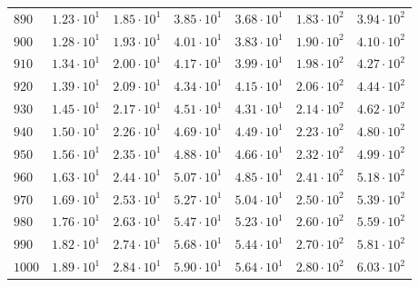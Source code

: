\begin{table}[h]
\begin{tabular}{lcccccc}
$	890	$ & $	1.23 \cdot 10^{1} 	$ & $	1.85 \cdot 10^{1} 	$ & $	3.85 \cdot 10^{1} 	$ & $	3.68 \cdot 10^{1} 	$ & $	1.83 \cdot 10^{2} 	$ & $	3.94 \cdot 10^{2} 	 $ \\
$	900	$ & $	1.28 \cdot 10^{1} 	$ & $	1.93 \cdot 10^{1} 	$ & $	4.01 \cdot 10^{1} 	$ & $	3.83 \cdot 10^{1} 	$ & $	1.90 \cdot 10^{2} 	$ & $	4.10 \cdot 10^{2} 	 $ \\
$	910	$ & $	1.34 \cdot 10^{1} 	$ & $	2.00 \cdot 10^{1} 	$ & $	4.17 \cdot 10^{1} 	$ & $	3.99 \cdot 10^{1} 	$ & $	1.98 \cdot 10^{2} 	$ & $	4.27 \cdot 10^{2} 	 $ \\
$	920	$ & $	1.39 \cdot 10^{1} 	$ & $	2.09 \cdot 10^{1} 	$ & $	4.34 \cdot 10^{1} 	$ & $	4.15 \cdot 10^{1} 	$ & $	2.06 \cdot 10^{2} 	$ & $	4.44 \cdot 10^{2} 	 $ \\
$	930	$ & $	1.45 \cdot 10^{1} 	$ & $	2.17 \cdot 10^{1} 	$ & $	4.51 \cdot 10^{1} 	$ & $	4.31 \cdot 10^{1} 	$ & $	2.14 \cdot 10^{2} 	$ & $	4.62 \cdot 10^{2} 	 $ \\
$	940	$ & $	1.50 \cdot 10^{1} 	$ & $	2.26 \cdot 10^{1} 	$ & $	4.69 \cdot 10^{1} 	$ & $	4.49 \cdot 10^{1} 	$ & $	2.23 \cdot 10^{2} 	$ & $	4.80 \cdot 10^{2} 	 $ \\
$	950	$ & $	1.56 \cdot 10^{1} 	$ & $	2.35 \cdot 10^{1} 	$ & $	4.88 \cdot 10^{1} 	$ & $	4.66 \cdot 10^{1} 	$ & $	2.32 \cdot 10^{2} 	$ & $	4.99 \cdot 10^{2} 	 $ \\
$	960	$ & $	1.63 \cdot 10^{1} 	$ & $	2.44 \cdot 10^{1} 	$ & $	5.07 \cdot 10^{1} 	$ & $	4.85 \cdot 10^{1} 	$ & $	2.41 \cdot 10^{2} 	$ & $	5.18 \cdot 10^{2} 	 $ \\
$	970	$ & $	1.69 \cdot 10^{1} 	$ & $	2.53 \cdot 10^{1} 	$ & $	5.27 \cdot 10^{1} 	$ & $	5.04 \cdot 10^{1} 	$ & $	2.50 \cdot 10^{2} 	$ & $	5.39 \cdot 10^{2} 	 $ \\
$	980	$ & $	1.76 \cdot 10^{1} 	$ & $	2.63 \cdot 10^{1} 	$ & $	5.47 \cdot 10^{1} 	$ & $	5.23 \cdot 10^{1} 	$ & $	2.60 \cdot 10^{2} 	$ & $	5.59 \cdot 10^{2} 	 $ \\
$	990	$ & $	1.82 \cdot 10^{1} 	$ & $	2.74 \cdot 10^{1} 	$ & $	5.68 \cdot 10^{1} 	$ & $	5.44 \cdot 10^{1} 	$ & $	2.70 \cdot 10^{2} 	$ & $	5.81 \cdot 10^{2} 	 $ \\
$	1000	$ & $	1.89 \cdot 10^{1} 	$ & $	2.84 \cdot 10^{1} 	$ & $	5.90 \cdot 10^{1} 	$ & $	5.64 \cdot 10^{1} 	$ & $	2.80 \cdot 10^{2} 	$ & $	6.03 \cdot 10^{2} 	 $ \\
    \hline
  \end{tabular}
\end{table}

 
